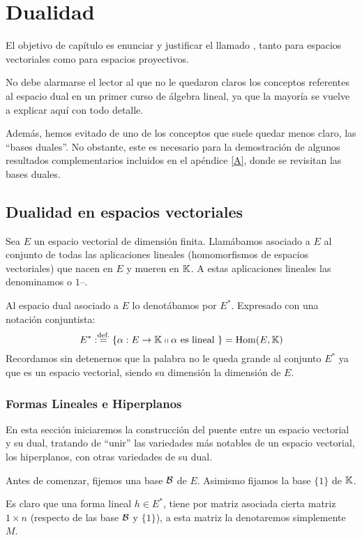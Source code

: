 \chapter{Dualidad}
\label{C2}
El objetivo de capítulo es enunciar y justificar el llamado , tanto para espacios vectoriales como para espacios proyectivos.

No debe alarmarse el lector al que no le quedaron claros los conceptos referentes al espacio dual en un primer curso de álgebra lineal, ya que la mayoría se vuelve a explicar aquí con todo detalle.

Además, hemos evitado de uno de los conceptos que suele quedar menos claro, las ``bases duales''. No obstante, este es necesario para la demostración de algunos resultados complementarios incluidos en el apéndice \ref{A}, donde se revisitan las bases duales.
\section{Dualidad en espacios vectoriales}
\label{C2_dualidadVectoriales}
Sea $E$ un espacio vectorial de dimensión finita. Llamábamos  asociado a $E$ al conjunto de todas las aplicaciones lineales (homomorfismos de espacios vectoriales) que nacen en $E$ y mueren en $\mathbb{K}$. A estas aplicaciones lineales las denominamos  o $1$--.

Al espacio dual asociado a $E$ lo denotábamos por $E^*$. Expresado con una notación conjuntista:
\begin{equation}
	\label{C2_eq_defDual}
	E^*:\stackrel{\textrm{def.}}{=}\{\alpha:E\rightarrow \mathbb{K}\shortparallel \alpha \text{ es lineal }\}=\mathrm{Hom}(E,\mathbb{K})
\end{equation}
Recordamos sin detenernos que la palabra  no le queda grande al conjunto $E^*$ ya que es un espacio vectorial, siendo su dimensión la dimensión de $E$.
\subsection{Formas Lineales e Hiperplanos}
En esta sección iniciaremos la construcción del puente entre un espacio vectorial y su dual, tratando de ``unir'' las variedades más notables de un espacio vectorial, los hiperplanos, con otras variedades de su dual.
 
Antes de comenzar, fijemos una base $\mathcal{B}$ de $E$. Asimismo fijamos la base $\{1\}$ de $\mathbb{K}$.

Es claro que una forma lineal $h\in E^*$, tiene por matriz asociada cierta matriz $1\times n$ (respecto de las base $\mathcal{B}$ y $\{1\}$), a esta matriz la  denotaremos simplemente $M$.

